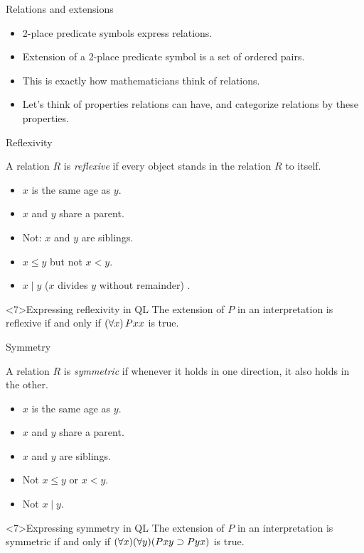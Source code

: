 \begin{frame}{Relations and extensions}
  
  \begin{itemize}[<+->]
    \item 2-place predicate symbols express relations.
    \item Extension of a 2-place predicate symbol is a set of ordered pairs.
    \item This is exactly how mathematicians think of relations.
    \item Let's think of properties relations can have, and categorize
    relations by these properties.
  \end{itemize}
\end{frame}

\begin{frame}{Reflexivity}
  \begin{definition}
    A relation $R$ is \emph{reflexive} if every object stands in the
    relation $R$ to itself.
  \end{definition}
\pause
  \begin{itemize}[<+->]
    \item $x$ is the same age as $y$.
    \item $x$ and $y$ share a parent.
    \item Not: $x$ and $y$ are siblings.
    \item $x \le y$ but not $x < y$.
    \item $x \mid y$ ($x$ divides $y$ without remainder) .
  \end{itemize}

  \begin{block}<7>{Expressing reflexivity in QL}
    The extension of $P$ in an interpretation is reflexive
    if and only if $(\forall x)\,Pxx$ is true.
  \end{block}
\end{frame}


\begin{frame}{Symmetry}
  \begin{definition}
    A relation $R$ is \emph{symmetric} if whenever it holds in one
    direction, it also holds in the other.
  \end{definition}
\pause
  \begin{itemize}[<+->]
    \item $x$ is the same age as $y$.
    \item $x$ and $y$ share a parent.
    \item $x$ and $y$ are siblings.
    \item Not $x \le y$ or $x < y$.
    \item Not $x \mid y$.
  \end{itemize}

  \begin{block}<7>{Expressing symmetry in QL}
    The extension of $P$ in an interpretation is symmetric
    if and only if $(\forall x)(\forall y)(Pxy \supset Pyx)$ is true.
  \end{block}
\end{frame}



